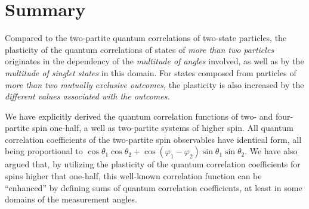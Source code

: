\documentclass[fleqn,twoside]{article}      %
\begin{document}
\section{Summary}

Compared to the two-partite quantum correlations of two-state particles,
the plasticity of the quantum correlations of states of {\em more than  two particles }
originates in the dependency of the {\em multitude of angles} involved, as well as by the {\em multitude of singlet states} in this domain.
For states composed from particles of {\em more than two mutually exclusive outcomes,} the plasticity
is also increased by the {\em different values associated with the outcomes.}

We have explicitly derived the quantum correlation functions of two- and four-partite spin one-half, a well as two-partite systems of higher spin.
All quantum correlation coefficients of the two-partite spin observables have identical form, all being proportional to
$\cos \theta_1 \cos \theta_2 + \cos (\varphi_1 - \varphi_2) \sin \theta_1 \sin \theta_2$.
We have also argued that, by utilizing the plasticity of the quantum correlation coefficients for spins higher that one-half,
this well-known correlation function can be ``enhanced'' by defining sums of quantum correlation coefficients,
at least in some domains of the measurement angles.
\end{document}
